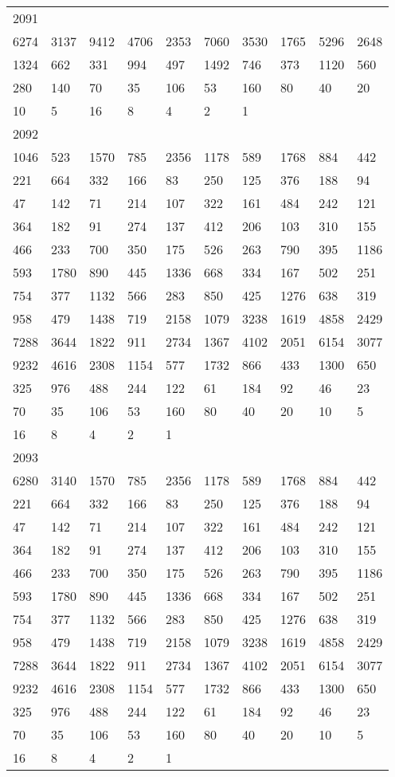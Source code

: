 \begin{longtable}{*{10}{l}}
2091&&&&&&&&&\\
6274& 3137& 9412& 4706& 2353& 7060& 3530& 1765& 5296& 2648\\
1324& 662& 331& 994& 497& 1492& 746& 373& 1120& 560\\
280& 140& 70& 35& 106& 53& 160& 80& 40& 20\\
10& 5& 16& 8& 4& 2& 1& \\

2092&&&&&&&&&\\
1046& 523& 1570& 785& 2356& 1178& 589& 1768& 884& 442\\
221& 664& 332& 166& 83& 250& 125& 376& 188& 94\\
47& 142& 71& 214& 107& 322& 161& 484& 242& 121\\
364& 182& 91& 274& 137& 412& 206& 103& 310& 155\\
466& 233& 700& 350& 175& 526& 263& 790& 395& 1186\\
593& 1780& 890& 445& 1336& 668& 334& 167& 502& 251\\
754& 377& 1132& 566& 283& 850& 425& 1276& 638& 319\\
958& 479& 1438& 719& 2158& 1079& 3238& 1619& 4858& 2429\\
7288& 3644& 1822& 911& 2734& 1367& 4102& 2051& 6154& 3077\\
9232& 4616& 2308& 1154& 577& 1732& 866& 433& 1300& 650\\
325& 976& 488& 244& 122& 61& 184& 92& 46& 23\\
70& 35& 106& 53& 160& 80& 40& 20& 10& 5\\
16& 8& 4& 2& 1& \\

2093&&&&&&&&&\\
6280& 3140& 1570& 785& 2356& 1178& 589& 1768& 884& 442\\
221& 664& 332& 166& 83& 250& 125& 376& 188& 94\\
47& 142& 71& 214& 107& 322& 161& 484& 242& 121\\
364& 182& 91& 274& 137& 412& 206& 103& 310& 155\\
466& 233& 700& 350& 175& 526& 263& 790& 395& 1186\\
593& 1780& 890& 445& 1336& 668& 334& 167& 502& 251\\
754& 377& 1132& 566& 283& 850& 425& 1276& 638& 319\\
958& 479& 1438& 719& 2158& 1079& 3238& 1619& 4858& 2429\\
7288& 3644& 1822& 911& 2734& 1367& 4102& 2051& 6154& 3077\\
9232& 4616& 2308& 1154& 577& 1732& 866& 433& 1300& 650\\
325& 976& 488& 244& 122& 61& 184& 92& 46& 23\\
70& 35& 106& 53& 160& 80& 40& 20& 10& 5\\
16& 8& 4& 2& 1& \\


\end{longtable}
